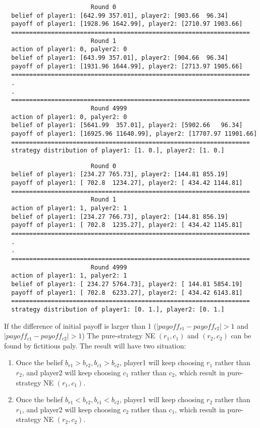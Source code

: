 \documentclass[a4paper, oneside, final, 12pt]{scrartcl} %
\begin{document}
\begin{lstlisting}
                        Round 0
  belief of player1: [642.99 357.01], player2: [903.66  96.34]
  payoff of player1: [1928.96 1642.99], player2: [2710.97 1903.66]
  ==================================================================
                        Round 1
  action of player1: 0, palyer2: 0
  belief of player1: [643.99 357.01], player2: [904.66  96.34]
  payoff of player1: [1931.96 1644.99], player2: [2713.97 1905.66]
  ==================================================================
  .
  .
  ==================================================================
                        Round 4999
  action of player1: 0, palyer2: 0
  belief of player1: [5641.99  357.01], player2: [5902.66   96.34]
  payoff of player1: [16925.96 11640.99], player2: [17707.97 11901.66]
  ==================================================================
  strategy distribution of player1: [1. 0.], player2: [1. 0.]
\end{lstlisting}

\begin{lstlisting}
                        Round 0
  belief of player1: [234.27 765.73], player2: [144.81 855.19]
  payoff of player1: [ 702.8  1234.27], player2: [ 434.42 1144.81]
  ==================================================================
                        Round 1
  action of player1: 1, palyer2: 1
  belief of player1: [234.27 766.73], player2: [144.81 856.19]
  payoff of player1: [ 702.8  1235.27], player2: [ 434.42 1145.81]
  ==================================================================
  .
  .
  ==================================================================
                        Round 4999
  action of player1: 1, palyer2: 1
  belief of player1: [ 234.27 5764.73], player2: [ 144.81 5854.19]
  payoff of player1: [ 702.8  6233.27], player2: [ 434.42 6143.81]
  ==================================================================
  strategy distribution of player1: [0. 1.], player2: [0. 1.]
\end{lstlisting}

\newpage

\begingroup
\raggedright
If the difference of initial payoff is larger than 1
($|payoff_{r1} - payoff_{r2}| > 1$ and $|payoff_{c1} - payoff_{c2}| > 1$)
The pure-strategy NE $(r_1, c_1)$ and $(r_2, c_2)$ can be found by fictitious paly.
The result will have two situation:

\begin{enumerate}
  \item Once the belief $b_{r1} > b_{r2}, b_{c1} > b_{c2}$,
  player1 will keep choosing $r_1$ rather than $r_2$, 
  and player2 will keep choosing $c_1$ rather than $c_2$, 
  which result in pure-strategy NE $(r_1, c_1)$.
  \item Once the belief $b_{r1} < b_{r2}, b_{c1} < b_{c2}$,
  player1 will keep choosing $r_2$ rather than $r_1$, 
  and player2 will keep choosing $c_2$ rather than $c_1$, 
  which result in pure-strategy NE $(r_2, c_2)$.
\end{enumerate}
\endgroup
\end{document}
